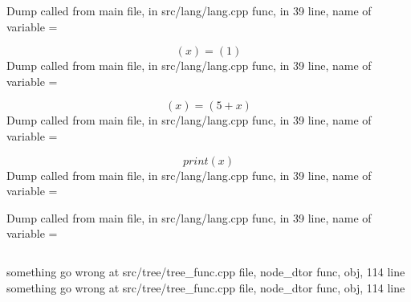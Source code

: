 \documentclass{article}
\begin{document}
Dump called from main file, in src/lang/lang.cpp func, in 39 line, name of variable = 


$$
(x) = (1)
$$
Dump called from main file, in src/lang/lang.cpp func, in 39 line, name of variable = 


$$
(x) = (5 + x)
$$
Dump called from main file, in src/lang/lang.cpp func, in 39 line, name of variable = 


$$
 print (x)
$$
Dump called from main file, in src/lang/lang.cpp func, in 39 line, name of variable = 


$$

$$
Dump called from main file, in src/lang/lang.cpp func, in 39 line, name of variable = 


$$

$$

something go wrong at src/tree/tree_func.cpp file, node_dtor func,  obj, 114 line
something go wrong at src/tree/tree_func.cpp file, node_dtor func,  obj, 114 line
\end{document}

